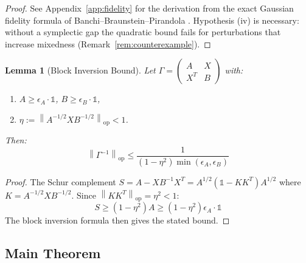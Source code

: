 \documentclass[11pt,a4paper]{article}
\newcommand{\idm}{\mathds{1}}}{\newcommand{\idm}{\mathbf{1}}}
\theoremstyle{plain}
\newtheorem{lemma}[theorem]{Lemma}
\theoremstyle{definition}
\theoremstyle{remark}
\newcommand{\opnorm}[1]{\left\lVert #1 \right\rVert_{\mathrm{op}}}
\begin{document}
\begin{proof}
See Appendix~\ref{app:fidelity} for the derivation from the exact Gaussian fidelity
formula of Banchi--Braunstein--Pirandola \cite{BanchiBP15}. Hypothesis (iv) is
necessary: without a symplectic gap the quadratic bound fails for perturbations that
increase mixedness (Remark~\ref{rem:counterexample}).
\end{proof}

\begin{lemma}[Block Inversion Bound]\label{lem:blockinv}
Let $\Gamma = \begin{pmatrix} A & X \\ X^T & B \end{pmatrix}$ with:
\begin{enumerate}
\item[(i)] $A \ge \epsilon_A \cdot \idm$, $B \ge \epsilon_B \cdot \idm$,
\item[(ii)] $\eta := \opnorm{A^{-1/2} X B^{-1/2}} < 1$.
\end{enumerate}
Then:
\begin{equation}
\opnorm{\Gamma^{-1}} \le \frac{1}{(1 - \eta^2)\min(\epsilon_A, \epsilon_B)}
\end{equation}
\end{lemma}

\begin{proof}
The Schur complement $S = A - X B^{-1} X^T = A^{1/2}(\idm - K K^T)A^{1/2}$
where $K = A^{-1/2} X B^{-1/2}$. Since $\opnorm{K K^T} = \eta^2 < 1$:
\begin{equation}
S \ge (1 - \eta^2) A \ge (1 - \eta^2)\epsilon_A \cdot \idm
\end{equation}
The block inversion formula then gives the stated bound.
\end{proof}

\subsection{Main Theorem}
\end{document}
